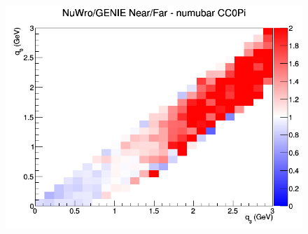 \begin{figure}[h]
\endminipage
{}
\includegraphics[width=\linewidth]{q0_q3/nominal/ratios/CC0Pi_NuWro_GENIE_numubar_NF_q3_q0.png}
\endminipage
\newline
\end{figure}
\clearpage
